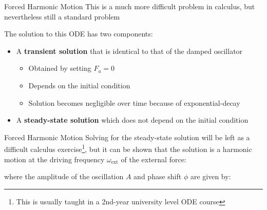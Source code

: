 \documentclass[12pt,compress,aspectratio=169]{beamer}
\begin{document}
\begin{frame}{Forced Harmonic Motion}
  This is a much more difficult problem in calculus, but nevertheless still a
  standard problem
  
  
  The solution to this ODE has two components:
  \begin{itemize}
  \item A \textbf{transient solution} that is identical to that of the damped
    oscillator
    \begin{itemize}
    \item Obtained by setting $F_a=0$
    \item Depends on the initial condition
    \item Solution becomes negligible over time because of exponential-decay
    \end{itemize}
  \item A \textbf{steady-state solution} which does not depend on the initial
    condition
  \end{itemize}
\end{frame}



\begin{frame}{Forced Harmonic Motion}
  Solving for the steady-state solution will be left as a difficult calculus
  exercise\footnote{This is usually taught in a 2nd-year university level ODE
  course}, but it can be shown that the solution is a harmonic motion at the
  driving frequency $\omega_\text{ext}$ of the external force:

  
  where the amplitude of the oscillation $A$ and phase shift $\phi$ are given
  by:

  \vspace{.5in}
\end{frame}
\end{document}
